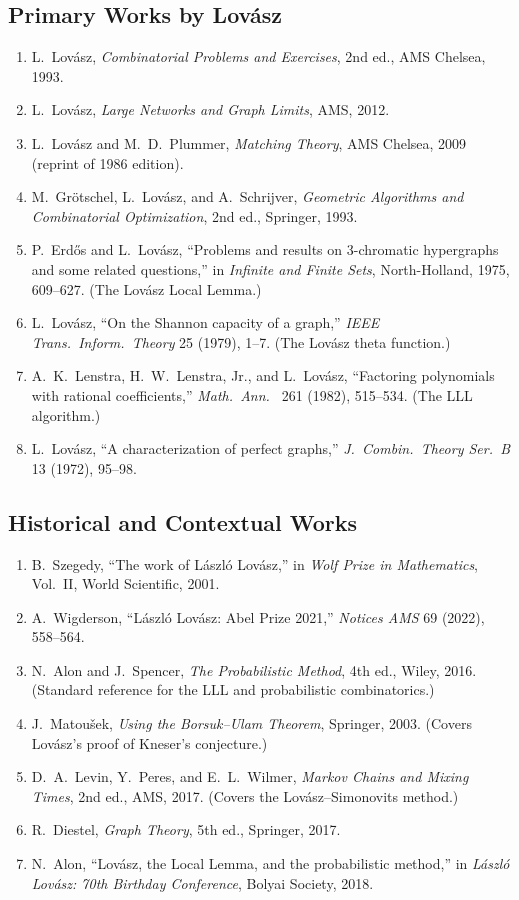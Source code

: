\subsection*{Primary Works by Lov\'{a}sz}
\begin{enumerate}
  \item L.\ Lov\'{a}sz, \textit{Combinatorial Problems and Exercises}, 2nd ed., AMS Chelsea, 1993.
  \item L.\ Lov\'{a}sz, \textit{Large Networks and Graph Limits}, AMS, 2012.
  \item L.\ Lov\'{a}sz and M.\ D.\ Plummer, \textit{Matching Theory}, AMS Chelsea, 2009 (reprint of 1986 edition).
  \item M.\ Gr\"{o}tschel, L.\ Lov\'{a}sz, and A.\ Schrijver, \textit{Geometric Algorithms and Combinatorial Optimization}, 2nd ed., Springer, 1993.
  \item P.\ Erd\H{o}s and L.\ Lov\'{a}sz, ``Problems and results on 3-chromatic hypergraphs and some related questions,'' in \textit{Infinite and Finite Sets}, North-Holland, 1975, 609--627. (The Lov\'{a}sz Local Lemma.)
  \item L.\ Lov\'{a}sz, ``On the Shannon capacity of a graph,'' \textit{IEEE Trans.\ Inform.\ Theory} 25 (1979), 1--7. (The Lov\'{a}sz theta function.)
  \item A.\ K.\ Lenstra, H.\ W.\ Lenstra, Jr., and L.\ Lov\'{a}sz, ``Factoring polynomials with rational coefficients,'' \textit{Math.\ Ann.\ } 261 (1982), 515--534. (The LLL algorithm.)
  \item L.\ Lov\'{a}sz, ``A characterization of perfect graphs,'' \textit{J.\ Combin.\ Theory Ser.\ B} 13 (1972), 95--98.
\end{enumerate}

\subsection*{Historical and Contextual Works}
\begin{enumerate}
  \item B.\ Szegedy, ``The work of L\'{a}szl\'{o} Lov\'{a}sz,'' in \textit{Wolf Prize in Mathematics}, Vol.\ II, World Scientific, 2001.
  \item A.\ Wigderson, ``L\'{a}szl\'{o} Lov\'{a}sz: Abel Prize 2021,'' \textit{Notices AMS} 69 (2022), 558--564.
  \item N.\ Alon and J.\ Spencer, \textit{The Probabilistic Method}, 4th ed., Wiley, 2016. (Standard reference for the LLL and probabilistic combinatorics.)
  \item J.\ Matou\v{s}ek, \textit{Using the Borsuk--Ulam Theorem}, Springer, 2003. (Covers Lov\'{a}sz's proof of Kneser's conjecture.)
  \item D.\ A.\ Levin, Y.\ Peres, and E.\ L.\ Wilmer, \textit{Markov Chains and Mixing Times}, 2nd ed., AMS, 2017. (Covers the Lov\'{a}sz--Simonovits method.)
  \item R.\ Diestel, \textit{Graph Theory}, 5th ed., Springer, 2017.
  \item N.\ Alon, ``Lov\'{a}sz, the Local Lemma, and the probabilistic method,'' in \textit{L\'{a}szl\'{o} Lov\'{a}sz: 70th Birthday Conference}, Bolyai Society, 2018.
\end{enumerate}

